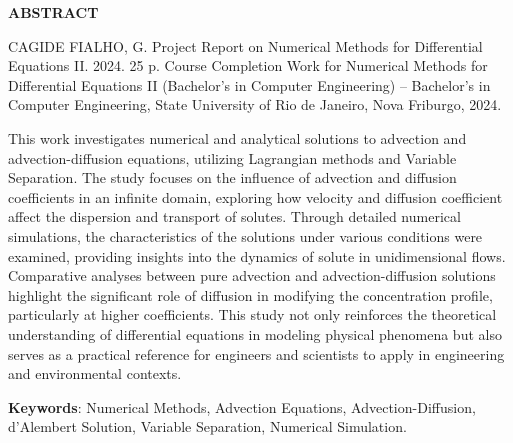 \begin{titlepage}
    \thispagestyle{empty} %

    \begin{center}
        \textbf{\Large ABSTRACT}
    \end{center}

    \vspace{1cm} %

    \noindent CAGIDE FIALHO, G. Project Report on Numerical Methods for Differential Equations II. 2024. 25 p. Course Completion Work for Numerical Methods for Differential Equations II (Bachelor’s in Computer Engineering) – Bachelor’s in Computer Engineering, State University of Rio de Janeiro, Nova Friburgo, 2024.

    \vspace{0.4cm} %

    This work investigates numerical and analytical solutions to advection and advection-diffusion equations, utilizing Lagrangian methods and Variable Separation. The study focuses on the influence of advection and diffusion coefficients in an infinite domain, exploring how velocity and diffusion coefficient affect the dispersion and transport of solutes. Through detailed numerical simulations, the characteristics of the solutions under various conditions were examined, providing insights into the dynamics of solute in unidimensional flows. Comparative analyses between pure advection and advection-diffusion solutions highlight the significant role of diffusion in modifying the concentration profile, particularly at higher coefficients. This study not only reinforces the theoretical understanding of differential equations in modeling physical phenomena but also serves as a practical reference for engineers and scientists to apply in engineering and environmental contexts.

    \vspace{0.4cm} %

    \textbf{Keywords}: Numerical Methods, Advection Equations, Advection-Diffusion, d’Alembert Solution, Variable Separation, Numerical Simulation.
\end{titlepage}
